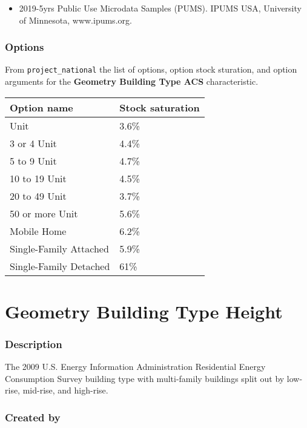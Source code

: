 \begin{itemize}
 
\item
  2019-5yrs Public Use Microdata Samples (PUMS). IPUMS USA, University
  of Minnesota, www.ipums.org.
\end{itemize}

\subsubsection{Options}\label{options-49}

From \texttt{project\_national} the list of options, option stock
sturation, and option arguments for the \textbf{Geometry Building Type
ACS} characteristic.

\begin{longtable}[]{@{}ll@{}}
\toprule\noalign{}
Option name & Stock saturation \\
\midrule\noalign{}
\endhead
\bottomrule\noalign{}
\endlastfoot
2 Unit & 3.6\% \\
3 or 4 Unit & 4.4\% \\
5 to 9 Unit & 4.7\% \\
10 to 19 Unit & 4.5\% \\
20 to 49 Unit & 3.7\% \\
50 or more Unit & 5.6\% \\
Mobile Home & 6.2\% \\
Single-Family Attached & 5.9\% \\
Single-Family Detached & 61\% \\
\end{longtable}

\section{Geometry Building Type
Height}\label{geometry_building_type_height}

\subsubsection{Description}\label{description-50}

The 2009 U.S. Energy Information Administration Residential Energy
Consumption Survey building type with multi-family buildings split out
by low-rise, mid-rise, and high-rise.

\subsubsection{Created by}\label{created-by-50}

